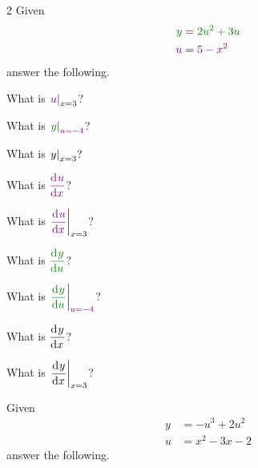 

\begin{multicols}{2}
 Given
 \begin{equation*}
  \begin{split}
    \OuterStyle{y} &= \OuterStyle{2 u^2 + 3 u}
    \\
    \InnerStyle{u} &= \InnerStyle{5 - x^2}
  \end{split}
 \end{equation*}
 answer the following.
 \bigskip

 \begin{ProblemSet}[pencil space=1.25in]

  \begin{Problem}
   What is $\displaystyle{\Where{\InnerStyle{u}}{x=3}}$?
  \end{Problem}
  \begin{Problem}
   What is $\displaystyle{\Where{\OuterStyle{y}}{\InnerStyle{u=-4}}}$?
  \end{Problem}
  \begin{Problem}
   What is $\displaystyle\left.y\right|_{x=3}?$
  \end{Problem}
  \begin{Problem}
   What is $\displaystyle{\InnerStyle{\Deriv{u}{x}}}$?
  \end{Problem}
  \begin{Problem}
   What is $\displaystyle{\Where{\InnerStyle{\Deriv{u}{x}}}{x=3}}$?
  \end{Problem}
  \begin{Problem}
   What is $\displaystyle{\OuterStyle{\Deriv{y}{u}}}$?
  \end{Problem}
  \begin{Problem}
   What is $\displaystyle{\Where{\OuterStyle{\Deriv{y}{u}}}{\InnerStyle{u=-4}}}$?
  \end{Problem}
  \begin{Problem}
   What is $\displaystyle\frac{\mathrm{d}^{{}}y}{\mathrm{d} x^{{}}}$?
  \end{Problem}
  \begin{Problem}
   What is $\displaystyle\left.\frac{\mathrm{d}^{{}}y}{\mathrm{d} x^{{}}}\right|_{x=3}$?
  \end{Problem}
 \end{ProblemSet}
\end{multicols}

Given
\begin{equation*}
 \begin{split}
   y &= -u^3 + 2 u^2
   \\
   u &= x^2 - 3x - 2
 \end{split}
\end{equation*}
answer the following.
\bigskip

